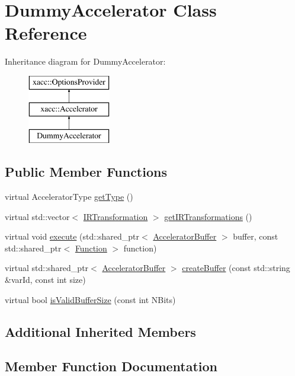 \hypertarget{a00976}{}\section{Dummy\+Accelerator Class Reference}
\label{a00976}
Inheritance diagram for Dummy\+Accelerator\+:\begin{figure}[H]
\begin{center}
\leavevmode
\includegraphics[height=3.000000cm]{a00976}
\end{center}
\end{figure}
\subsection*{Public Member Functions}
\begin{DoxyCompactItemize}
\item 
virtual Accelerator\+Type \hyperlink{a00976_acdfe3e856f2bacc9e0dc1a51782a52e3}{get\+Type} ()
\item 
virtual std\+::vector$<$ \hyperlink{a01152}{I\+R\+Transformation} $>$ \hyperlink{a00976_aac0e2ae753064701468fa1188ac7549f}{get\+I\+R\+Transformations} ()
\item 
virtual void \hyperlink{a00976_a389ba22af5d0d964f5d5367f01712b3c}{execute} (std\+::shared\+\_\+ptr$<$ \hyperlink{a01096}{Accelerator\+Buffer} $>$ buffer, const std\+::shared\+\_\+ptr$<$ \hyperlink{a01124}{Function} $>$ function)
\item 
virtual std\+::shared\+\_\+ptr$<$ \hyperlink{a01096}{Accelerator\+Buffer} $>$ \hyperlink{a00976_aa645e7ba6343aa9812836d1e141bd7c8}{create\+Buffer} (const std\+::string \&var\+Id, const int size)
\item 
virtual bool \hyperlink{a00976_a831ad0c71864920cc49a00d29768af8c}{is\+Valid\+Buffer\+Size} (const int N\+Bits)
\end{DoxyCompactItemize}
\subsection*{Additional Inherited Members}


\subsection{Member Function Documentation}
\mbox{\label{a00976_aa645e7ba6343aa9812836d1e141bd7c8}} 
